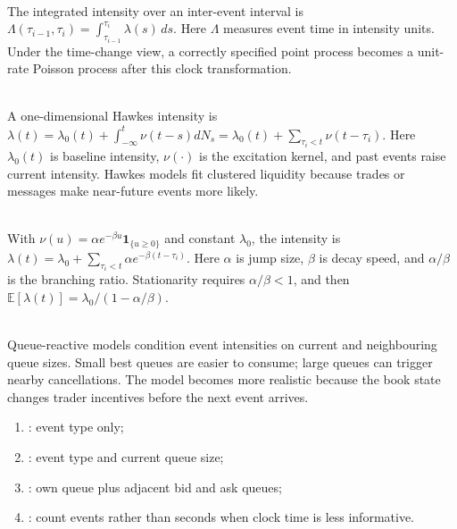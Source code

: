 \begin{definition} \\
The integrated intensity over an inter-event interval is $\Lambda(\tau_{i-1},\tau_i)=\int_{\tau_{i-1}}^{\tau_i}\lambda(s)\,ds$. Here $\Lambda$ measures event time in intensity units. Under the time-change view, a correctly specified point process becomes a unit-rate Poisson process after this clock transformation.
\end{definition}

\begin{model} \\
A one-dimensional Hawkes intensity is $\lambda(t)=\lambda_0(t)+\int_{-\infty}^{t}\nu(t-s)dN_s=\lambda_0(t)+\sum_{\tau_i<t}\nu(t-\tau_i)$. Here $\lambda_0(t)$ is baseline intensity, $\nu(\cdot)$ is the excitation kernel, and past events raise current intensity. Hawkes models fit clustered liquidity because trades or messages make near-future events more likely.
\end{model}

\begin{model} \\
With $\nu(u)=\alpha e^{-\beta u}\mathbf{1}_{\{u\geq0\}}$ and constant $\lambda_0$, the intensity is $\lambda(t)=\lambda_0+\sum_{\tau_i<t}\alpha e^{-\beta(t-\tau_i)}$. Here $\alpha$ is jump size, $\beta$ is decay speed, and $\alpha/\beta$ is the branching ratio. Stationarity requires $\alpha/\beta<1$, and then $\mathbb{E}[\lambda(t)]=\lambda_0/(1-\alpha/\beta)$.
\end{model}

\begin{mechanism} \\
Queue-reactive models condition event intensities on current and neighbouring queue sizes. Small best queues are easier to consume; large queues can trigger nearby cancellations. The model becomes more realistic because the book state changes trader incentives before the next event arrives.
\end{mechanism}

\begin{taxonomy} 
\begin{enumerate}[label=\roman*.]
\setlength{\itemsep}{0pt}
\item {}: event type only;
\item {}: event type and current queue size;
\item {}: own queue plus adjacent bid and ask queues;
\item {}: count events rather than seconds when clock time is less informative.
\end{enumerate}
\end{taxonomy}


